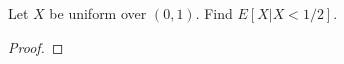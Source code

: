 \begin{problem}{3.14}
  Let $X$ be uniform over $(0, 1)$. Find $E[X|X<1/2]$.
\end{problem}

\begin{proof}
\end{proof}
\newpage
